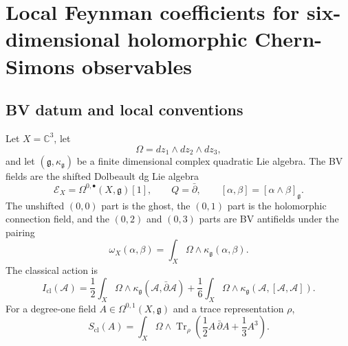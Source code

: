 \section{Local Feynman coefficients for six-dimensional holomorphic Chern-Simons observables}
\label{wn:sec:feynman-6d-hcs-local}

\providecommand{\kch}{\kappa_{\mathrm{ch}}}
\providecommand{\kcat}{\kappa_{\mathrm{cat}}}
\providecommand{\kBKM}{\kappa_{\mathrm{BKM}}}
\providecommand{\kfib}{\kappa_{\mathrm{fiber}}}
\providecommand{\kanom}{\kappa_{\mathrm{anom}}}
\providecommand{\cA}{\mathcal{A}}
\providecommand{\cE}{\mathcal{E}}
\providecommand{\cO}{\mathcal{O}}
\providecommand{\cZ}{\mathcal{Z}}
\providecommand{\CoHA}{\mathrm{CoHA}}
\providecommand{\Obs}{\mathrm{Obs}}
\providecommand{\hCS}{\mathrm{hCS}}
\providecommand{\dbar}{\bar\partial}
\providecommand{\dbarstar}{\bar\partial^{*}}
\providecommand{\HH}{\mathrm{HH}}
\providecommand{\Perf}{\mathrm{Perf}}
\providecommand{\Sym}{\mathrm{Sym}}
\providecommand{\Tr}{\operatorname{Tr}}
\providecommand{\End}{\operatorname{End}}
\providecommand{\Rep}{\operatorname{Rep}}
\providecommand{\Yp}{Y^{+}}
\providecommand{\Winf}{\mathcal{W}_{1+\infty}}
\providecommand{\Eone}{E_1}
\providecommand{\Etwo}{E_2}
\providecommand{\Ethree}{E_3}
\providecommand{\CC}{\mathbb{C}}
\providecommand{\RR}{\mathbb{R}}
\providecommand{\gfrak}{\mathfrak{g}}
\providecommand{\fgl}{\mathfrak{gl}}
\providecommand{\uone}{\mathfrak{u}(1)}
\providecommand{\sun}{\mathfrak{su}(N)}
\providecommand{\ad}{\mathrm{ad}}

\subsection{BV datum and local conventions}

Let \(X=\CC^3\), let
\[
  \Omega=dz_1\wedge dz_2\wedge dz_3,
\]
and let \((\gfrak,\kappa_{\gfrak})\) be a finite dimensional complex
quadratic Lie algebra.  The BV fields are the shifted Dolbeault dg Lie
algebra
\[
  \cE_X=\Omega^{0,\bullet}(X,\gfrak)[1],
  \qquad
  Q=\dbar,
  \qquad
  [\alpha,\beta]=[\alpha\wedge\beta]_{\gfrak}.
\]
The unshifted \((0,0)\) part is the ghost, the \((0,1)\) part is the
holomorphic connection field, and the \((0,2)\) and \((0,3)\) parts are
BV antifields under the pairing
\[
  \omega_X(\alpha,\beta)=
  \int_X\Omega\wedge\kappa_{\gfrak}(\alpha,\beta).
\]
The classical action is
\[
 I_{\mathrm{cl}}(\cA)
 =
 \frac12\int_X\Omega\wedge\kappa_{\gfrak}(\cA,\dbar\cA)
 +
 \frac16\int_X\Omega\wedge\kappa_{\gfrak}(\cA,[\cA,\cA]).
\]
For a degree-one field \(A\in\Omega^{0,1}(X,\gfrak)\) and a trace
representation \(\rho\),
\[
 S_{\mathrm{cl}}(A)
 =
 \int_X\Omega\wedge\Tr_{\rho}\left(
   \frac12 A\,\dbar A+\frac13 A^3
 \right).
\]

